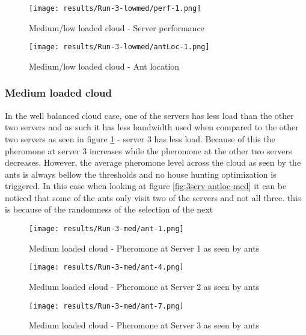 \begin{figure}
	\centering
		\texttt{[image: results/Run-3-lowmed/perf-1.png]}
	\caption{Medium/low loaded cloud - Server performance}
	\label{fig:3serv-perf-lowmed}
\end{figure}

\begin{figure}
	\centering
		\texttt{[image: results/Run-3-lowmed/antLoc-1.png]}
	\caption{Medium/low loaded cloud - Ant location}
	\label{fig:3serv-antloc-lowmed}
\end{figure}

\subsubsection{Medium loaded cloud}

In the well balanced cloud case, one of the servers has less load than the other two servers and as such it has less bandwidth used when compared to the other two servers as seen in figure \ref{fig:3serv-perf-lowmed} - server 3 has less load. Because of this the pheromone at server 3 increases while the pheromone at the other two servers decreases. However, the average pheromone level across the cloud as seen by the ants is always bellow the thresholds and no house hunting optimization is triggered. In this case when looking at figure \ref{fig:3serv-antloc-med} it can be noticed that some of the ants only visit two of the servers and not all three. this is because of the randomness of the selection of the next 

\begin{figure}[!h]
	\centering
		\texttt{[image: results/Run-3-med/ant-1.png]}
	\caption{Medium loaded cloud - Pheromone at Server 1 as seen by ants}
	\label{fig:3serv-ant1-med}
\end{figure}

\begin{figure}
	\centering
		\texttt{[image: results/Run-3-med/ant-4.png]}
	\caption{Medium loaded cloud - Pheromone at Server 2 as seen by ants}
	\label{fig:3serv-ant4-med}
\end{figure}

\begin{figure}
	\centering
		\texttt{[image: results/Run-3-med/ant-7.png]}
	\caption{Medium loaded cloud - Pheromone at Server 3 as seen by ants}
	\label{fig:3serv-ant7-med}
\end{figure}

